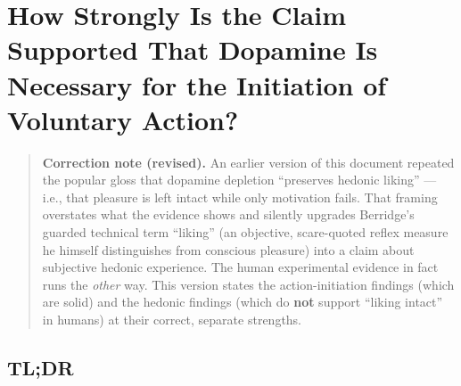 ﻿\section{How Strongly Is the Claim Supported That Dopamine Is Necessary for the Initiation of Voluntary Action?}\label{02_dopamine_action-how-strongly-is-the-claim-supported-that-dopamine-is-necessary-for-the-initiation-of-voluntary-action}

\begin{quote}
\textbf{Correction note (revised).} An earlier version of this document repeated the popular gloss that dopamine depletion ``preserves hedonic liking'' --- i.e., that pleasure is left intact while only motivation fails. That framing overstates what the evidence shows and silently upgrades Berridge's guarded technical term ``liking'' (an objective, scare-quoted reflex measure he himself distinguishes from conscious pleasure) into a claim about subjective hedonic experience. The human experimental evidence in fact runs the \emph{other} way. This version states the action-initiation findings (which are solid) and the hedonic findings (which do \textbf{not} support ``liking intact'' in humans) at their correct, separate strengths.
\end{quote}

\subsection{TL;DR}\label{02_dopamine_action-tldr}


